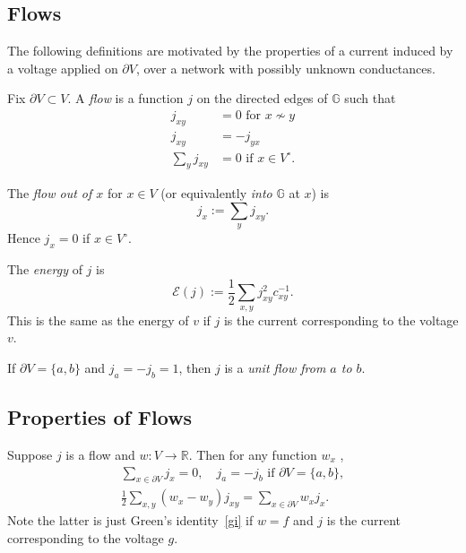 \documentclass[a4paper]{amsart}
\theoremstyle{plain}
\theoremstyle{definition}
\theoremstyle{remark}
\begin{document}
\subsection{Flows} The following definitions   are motivated by the properties of a current  induced by a voltage applied on $ \partial V $, over a network with possibly unknown conductances.  

\medskip Fix $ \partial V \subset V $.  A \emph{flow} is a function $ j $ on the directed edges of $ \mathbb{G}  $ such that 
\begin{equation} \label{fld}
\begin{aligned}
j_{xy} & = 0   \text{ for } x \not \sim y \\
j_{xy} &= - j_{yx} \\
\sum_y j_{xy} &= 0 \text{ if }x \in V^\circ .
\end{aligned}
\end{equation}


The \emph{flow out of $ x $} for $ x\in V $ (or equivalently \emph{into} $\mathbb{G}  $ at $ x $) is   
\[  j_x := \sum_y j_{xy} . \]
Hence $ j_x = 0 $ if $ x \in V^\circ $.

The \emph{energy} of $ j $ is 
\begin{equation} \label{}
\boxed{\mathcal{E}(j) :=  \frac{1}{2} \sum_{x,y} j_{xy}^2 c_{xy}^{-1}.} 
\end{equation}
This is the same as the energy of $ v $ if $ j $ is the current corresponding to the voltage $ v $.

If $ \partial V = \{ a,b\} $ and $ j_a = -j_b = 1 $, then $ j $ is a \emph{unit flow from $ a $ to $ b $}.



\subsection{Properties of Flows}  Suppose $ j $ is a flow and $ w:V \to \mathbb{R} $. Then for any function $ w_x $ ,
\begin{equation} \label{prpf} 
\begin{gathered}
\sum_{x\in \partial V} j_x  = 0, \quad    j_a = -j_b \text{ if }  \partial V = \{ a,b\} , \\
\boxed{\frac{1}{2} \sum_{x,y} (w_x-w_y)j_{xy} =    \sum_{x\in \partial V} w_x j_x .}
\end{gathered} 
\end{equation}
Note the latter is just Green's identity~\eqref{gi}  if $ w= f $ and $ j $ is the current corresponding to the voltage $ g  $.
\end{document}

